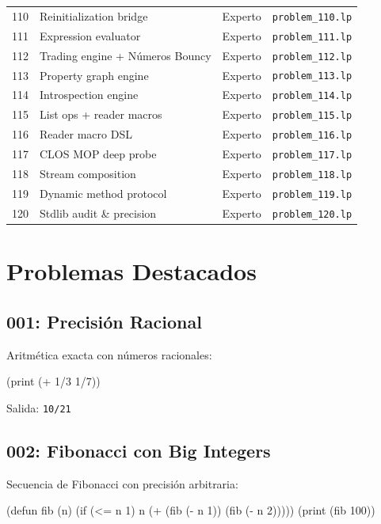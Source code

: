 \begin{center}
\begin{tabular}{clll}
110 & Reinitialization bridge & Experto & \texttt{problem\_110.lp} \\
111 & Expression evaluator & Experto & \texttt{problem\_111.lp} \\
112 & Trading engine + Números Bouncy & Experto & \texttt{problem\_112.lp} \\
113 & Property graph engine & Experto & \texttt{problem\_113.lp} \\
114 & Introspection engine & Experto & \texttt{problem\_114.lp} \\
115 & List ops + reader macros & Experto & \texttt{problem\_115.lp} \\
116 & Reader macro DSL & Experto & \texttt{problem\_116.lp} \\
117 & CLOS MOP deep probe & Experto & \texttt{problem\_117.lp} \\
118 & Stream composition & Experto & \texttt{problem\_118.lp} \\
119 & Dynamic method protocol & Experto & \texttt{problem\_119.lp} \\
120 & Stdlib audit \& precision & Experto & \texttt{problem\_120.lp} \\
\bottomrule
\end{tabular}
\end{center}

\section{Problemas Destacados}

\subsection*{001: Precisión Racional}

Aritmética exacta con números racionales:

\begin{lispcode}
(print (+ 1/3 1/7))
\end{lispcode}

Salida: \texttt{10/21}

\subsection*{002: Fibonacci con Big Integers}

Secuencia de Fibonacci con precisión arbitraria:

\begin{lispcode}
(defun fib (n)
  (if (<= n 1) n
      (+ (fib (- n 1)) (fib (- n 2)))))
(print (fib 100))
\end{lispcode}

